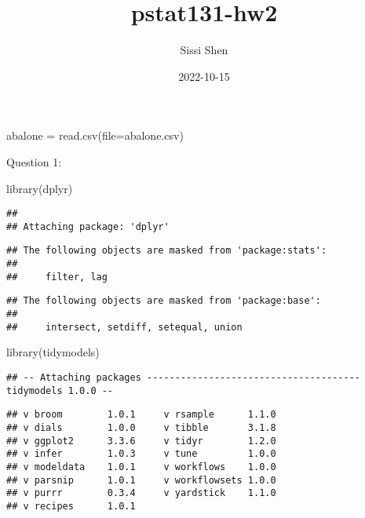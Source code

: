 \documentclass[
]{article}
\title{pstat131-hw2}
\author{Sissi Shen}
\date{2022-10-15}
\newenvironment{Shaded}{\begin{snugshade}}{\end{snugshade}}
\newcommand{\AttributeTok}[1]{\textcolor[rgb]{0.77,0.63,0.00}{#1}}
\newcommand{\FunctionTok}[1]{\textcolor[rgb]{0.00,0.00,0.00}{#1}}
\newcommand{\NormalTok}[1]{#1}
\newcommand{\OtherTok}[1]{\textcolor[rgb]{0.56,0.35,0.01}{#1}}
\newcommand{\StringTok}[1]{\textcolor[rgb]{0.31,0.60,0.02}{#1}}
\begin{document}
\maketitle

\begin{Shaded}
\begin{Highlighting}[]
\NormalTok{abalone }\OtherTok{=} \FunctionTok{read.csv}\NormalTok{(}\AttributeTok{file=}\StringTok{\textquotesingle{}abalone.csv\textquotesingle{}}\NormalTok{)}
\end{Highlighting}
\end{Shaded}

Question 1:\n

\begin{Shaded}
\begin{Highlighting}[]
\FunctionTok{library}\NormalTok{(dplyr)}
\end{Highlighting}
\end{Shaded}

\begin{verbatim}
## 
## Attaching package: 'dplyr'
\end{verbatim}

\begin{verbatim}
## The following objects are masked from 'package:stats':
## 
##     filter, lag
\end{verbatim}

\begin{verbatim}
## The following objects are masked from 'package:base':
## 
##     intersect, setdiff, setequal, union
\end{verbatim}

\begin{Shaded}
\begin{Highlighting}[]
\FunctionTok{library}\NormalTok{(tidymodels)}
\end{Highlighting}
\end{Shaded}

\begin{verbatim}
## -- Attaching packages -------------------------------------- tidymodels 1.0.0 --
\end{verbatim}

\begin{verbatim}
## v broom        1.0.1     v rsample      1.1.0
## v dials        1.0.0     v tibble       3.1.8
## v ggplot2      3.3.6     v tidyr        1.2.0
## v infer        1.0.3     v tune         1.0.0
## v modeldata    1.0.1     v workflows    1.0.0
## v parsnip      1.0.1     v workflowsets 1.0.0
## v purrr        0.3.4     v yardstick    1.1.0
## v recipes      1.0.1
\end{verbatim}
\end{document}
